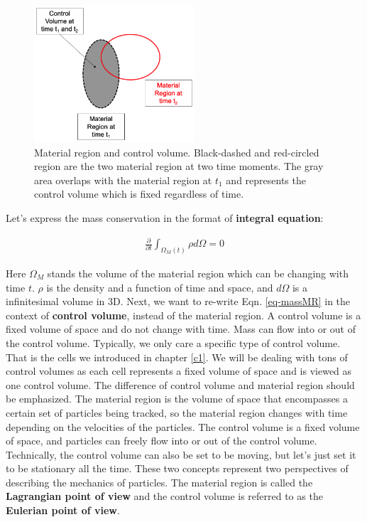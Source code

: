 \documentclass[11pt, letterpaper]{report}
\begin{document}
\begin{figure}[H]
   \centering
   \includegraphics[height=2in]{Fund1.png}
   \caption{Material region and control volume. Black-dashed and red-circled region are the
   two material region at two time moments. The gray area overlaps with the material region at $t_1$
   and represents the control volume which is fixed regardless of time.}
   \label{fig-fund1}
\end{figure}

Let's express the mass conservation in the format of {\bf integral equation}:

\begin{align}\label{eq-massMR}
   \frac{\partial}{\partial t}\int_{\Omega_M(t)}\rho d\Omega = 0
\end{align}

Here $\Omega_M$ stands the volume of the material region which can be changing with time $t$. $\rho$
is the density and a function of time and space, and $d\Omega$ is a infinitesimal volume in 3D.
Next, we want to re-write Eqn. \ref{eq-massMR} in the context of {\bf control volume}, instead of
the material region. A control volume is a fixed volume of space and
do not change with time. Mass can flow into or out of the control volume. Typically, we only care a
specific type of control volume. That is the cells we introduced in chapter \ref{c1}. We will be
dealing with tons of control volumes as each cell represents a fixed volume of space and is viewed
as one control volume. The difference of control volume and material region should be emphasized.
The material region is the volume of space that encompasses a certain set of particles being
tracked, so the material region changes with time depending on the velocities of the particles. The
control volume is a fixed volume of space, and particles can freely flow into or out of the control
volume. Technically, the control volume can also be set to be moving, but let's just set it to be
stationary all the time. These two concepts represent two perspectives of describing the mechanics
of particles. The material region is called the {\bf Lagrangian point of view} and the control
volume is referred to as the {\bf Eulerian point of view}.
\paraspace
\end{document}
